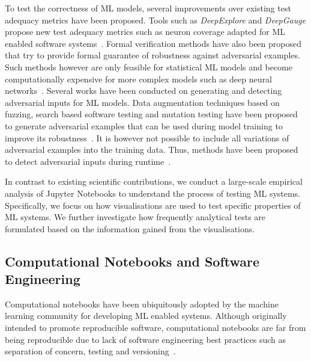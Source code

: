 \documentclass[conference]{IEEEtran}
\begin{document}
To test the correctness of ML models, several improvements over existing test adequacy metrics have been proposed. Tools such as \textit{DeepExplore} and \textit{DeepGauge} propose new test adequacy metrics such as neuron coverage adapted for ML enabled software systems~\cite{pei2017deepexplore, ma2018deepgauge, gerasimou2020importance}. Formal verification methods have also been proposed that try to provide formal guarantee of robustness against adversarial examples. Such methods however are only feasible for statistical ML models and become computationally expensive for more complex models such as deep neural networks~\cite{zhu2021deepmemory, baluta2021scalable}. Several works have been conducted on generating and detecting adversarial inputs for ML models. Data augmentation techniques based on fuzzing, search based software testing and mutation testing have been proposed to generate adversarial examples that can be used during model training to improve its robustness~\cite{braiek2019deepevolution, gao2020fuzz, wang2021robot, zhang2020white}. It is however not possible to include all variations of adversarial examples into the training data. Thus, methods have been proposed to detect adversarial inputs during runtime~\cite{xiao2021self, wang2020dissector, wang2019adversarial, berend2020cats}.

In contrast to existing scientific contributions, we conduct a large-scale empirical analysis of Jupyter Notebooks to understand the process of testing ML systems. Specifically, we focus on how visualisations are used to test specific properties of ML systems. We further investigate how frequently analytical tests are formulated based on the information gained from the visualisations.

\subsection{Computational Notebooks and Software Engineering}\label{sec:notebooks}

Computational notebooks have been ubiquitously adopted by the machine learning community for developing ML enabled systems. Although originally intended to promote reproducible software, computational notebooks are far from being reproducible due to lack of software engineering best practices such as separation of concern, testing and versioning~\cite{pimentel2019large,wang2020better,chattopadhyay2020wrong}.
\end{document}

